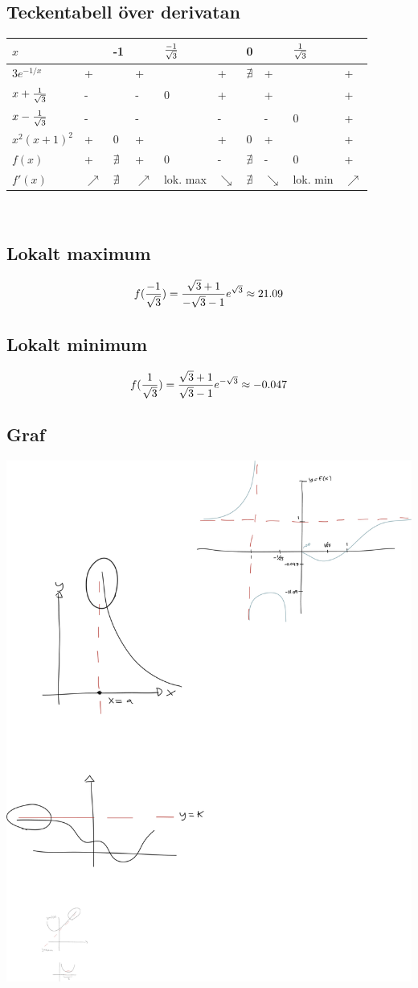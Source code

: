 \documentclass{article}
\begin{document}
\subsection{Teckentabell över derivatan}
\begin{tabular}{ l | l l l p{7mm} l l l p{7mm} l }
  $x$               &   & -1&   &$\frac{-1}{\sqrt 3}$&   & 0 &   &$\frac{1}{\sqrt 3}$&   \\\hline
  $3e^{-1/x}$       & + &   & + &   & + & $\nexists$ & + &   & + \\
  $x+\frac{1}{\sqrt{3}}$& - &   & - & 0 & + &   & + &   & + \\
  $x-\frac{1}{\sqrt{3}}$& - &   & - &   & - &   & - & 0 & + \\
  $x^2(x+1)^2$      & + & 0 & + &   & + & 0 & + &   & + \\\hline
  $f(x)$            & + & $\nexists$ & + & 0 & - & $\nexists$ & - & 0 & + \\
  $f'(x)$           & $\nearrow$ & $\nexists$ & $\nearrow$ & lok. max & $\searrow$  & $\nexists$ & $\searrow$  & lok. min & $\nearrow$
\end{tabular}\\

\subsection{Lokalt maximum}
$$ f(\frac{-1}{\sqrt 3}) = \frac{\sqrt 3 + 1}{-\sqrt 3 - 1} e^{\sqrt 3} \approx 21.09$$

\subsection{Lokalt minimum}
$$ f(\frac{1}{\sqrt 3}) = \frac{\sqrt 3 + 1}{\sqrt 3 - 1} e^{-\sqrt 3} \approx -0.047$$

\subsection{Graf}
\includegraphics[width=\textwidth]{img/graph.pdf}\\
\end{document}
